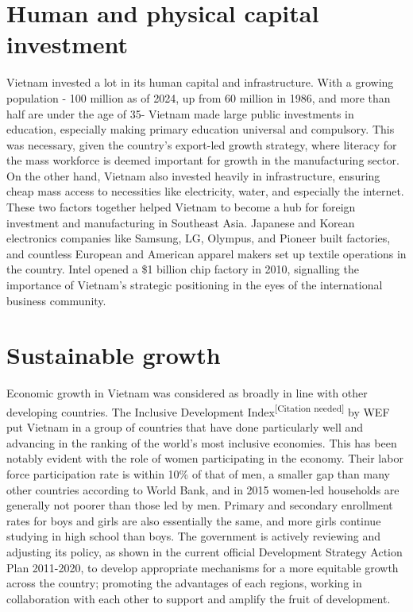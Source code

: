 \documentclass[openany]{book}
\begin{document}
\section{Human and physical capital investment}
Vietnam invested a lot in its human capital and infrastructure. With a growing population - 100 million as of 2024, up from 60 million in 1986, and more than half are under the age of 35- Vietnam made large public investments in education, especially making primary education universal and compulsory. This was necessary, given the country's export-led growth strategy, where literacy for the mass workforce is deemed important for growth in the manufacturing sector. On the other hand, Vietnam also invested heavily in infrastructure, ensuring cheap mass access to necessities like electricity, water, and especially the internet. These two factors together helped Vietnam to become a hub for foreign investment and manufacturing in Southeast Asia. Japanese and Korean electronics companies like Samsung, LG, Olympus, and Pioneer built factories, and countless European and American apparel makers set up textile operations in the country. Intel opened a \$1 billion chip factory in 2010, signalling the importance of Vietnam's strategic positioning in the eyes of the international business community.

\section{Sustainable growth}
Economic growth in Vietnam was considered as broadly in line with other developing countries. The Inclusive Development Index\textsuperscript{[Citation needed]} by WEF put Vietnam in a group of countries that have done particularly well and advancing in the ranking of the world's most inclusive economies. This has been notably evident with the role of women participating in the economy. Their labor force participation rate is within 10\% of that of men, a smaller gap than many other countries according to World Bank, and in 2015 women-led households are generally not poorer than those led by men. Primary and secondary enrollment rates for boys and girls are also essentially the same, and more girls continue studying in high school than boys. The government is actively reviewing and adjusting its policy, as shown in the current official Development Strategy Action Plan 2011-2020, to develop appropriate mechanisms for a more equitable growth across the country; promoting the advantages of each regions, working in collaboration with each other to support and amplify the fruit of development.
\end{document}
